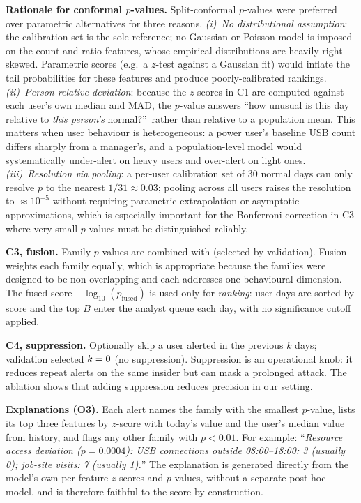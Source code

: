 \documentclass[conference]{IEEEtran}
\begin{document}
\textbf{Rationale for conformal $p$-values.}
Split-conformal $p$-values were preferred over parametric alternatives for three reasons.
\emph{(i)~No distributional assumption}: the calibration set is the sole reference; no Gaussian or
Poisson model is imposed on the count and ratio features, whose empirical distributions are heavily
right-skewed. Parametric scores (e.g.\ a $z$-test against a Gaussian fit) would inflate the
tail probabilities for these features and produce poorly-calibrated rankings.
\emph{(ii)~Person-relative deviation}: because the $z$-scores in C1 are computed against each
user's own median and MAD, the $p$-value answers ``how unusual is this day relative to
\emph{this person's} normal?''\, rather than relative to a population mean. This matters when
user behaviour is heterogeneous: a power user's baseline USB count differs sharply from a
manager's, and a population-level model would systematically under-alert on heavy users and
over-alert on light ones.
\emph{(iii)~Resolution via pooling}: a per-user calibration set of 30 normal days can only
resolve $p$ to the nearest $1/31\approx0.03$; pooling across all users raises the resolution to
$\approx10^{-5}$ without requiring parametric extrapolation or asymptotic approximations, which
is especially important for the Bonferroni correction in C3 where very small $p$-values
must be distinguished reliably.

\textbf{C3, fusion.} Family $p$-values are combined with \TunedFusion{} (selected by validation).
Fusion weights each family equally, which is appropriate because the families were designed to be
non-overlapping and each addresses one behavioural dimension. The fused score
$-\log_{10}(p_{\text{fused}})$ is used only for \emph{ranking}: user-days are sorted by score and
the top $B$ enter the analyst queue each day, with no significance cutoff applied.

\textbf{C4, suppression.} Optionally skip a user alerted in the previous $k$ days; validation
selected $k=0$ (no suppression). Suppression is an operational knob: it reduces
repeat alerts on the same insider but can mask a prolonged attack. The ablation shows that adding
suppression reduces precision in our setting.

\textbf{Explanations (O3).} Each alert names the family with the smallest $p$-value, lists its top
three features by $z$-score with today's value and the user's median value from history, and flags
any other family with $p<0.01$. For example: ``\textit{Resource access deviation ($p=0.0004$):
USB connections outside 08:00--18:00: 3 (usually 0); job-site visits: 7 (usually 1).}'' The
explanation is generated directly from the model's own per-feature $z$-scores and $p$-values,
without a separate post-hoc model, and is therefore faithful to the score by construction.
\end{document}
